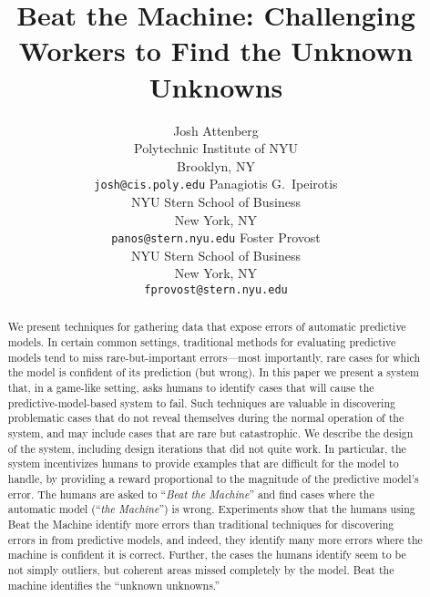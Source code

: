 \documentclass[letterpaper]{article}
\title{Beat the Machine: Challenging Workers to Find the Unknown Unknowns}
\author{
Josh Attenberg \\
Polytechnic Institute of NYU \\
Brooklyn, NY \\
\texttt{josh@cis.poly.edu}
\And 
Panagiotis G.\ Ipeirotis \\
NYU Stern School of Business \\
New York, NY \\
\texttt{panos@stern.nyu.edu}
\And 
Foster Provost \\
NYU Stern School of Business \\
New York, NY \\
\texttt{fprovost@stern.nyu.edu}
}
\begin{document}
\maketitle


\begin{abstract}

  We present techniques for gathering data that expose errors of automatic predictive models.  In certain common settings, traditional methods for evaluating predictive models tend to miss rare-but-important errors---most importantly, rare cases for which the model is confident of its prediction (but wrong).  In this paper we present a system that, in a game-like setting, asks humans to identify cases that will cause the predictive-model-based system to fail. Such techniques are  valuable in discovering problematic cases that do not reveal themselves during the normal operation of the system, and may include cases that are rare but catastrophic. We describe the design of the system, including design iterations that did not quite work. In particular, the system incentivizes humans to provide examples that are difficult for the model to handle, by providing a reward proportional to the magnitude of the predictive model's error. The humans are asked to ``\emph{Beat the Machine}'' and find cases where the automatic model (``\emph{the Machine}'') is wrong. Experiments show that the humans using Beat the Machine identify more errors than traditional techniques for discovering errors in from predictive models, and indeed, they identify many more errors where the machine is confident it is correct.  Further, the cases the humans identify seem to be not simply outliers, but coherent areas missed completely by the model.  Beat the machine identifies  the ``unknown unknowns.''

\end{abstract}









\small{

 
}
\end{document}
